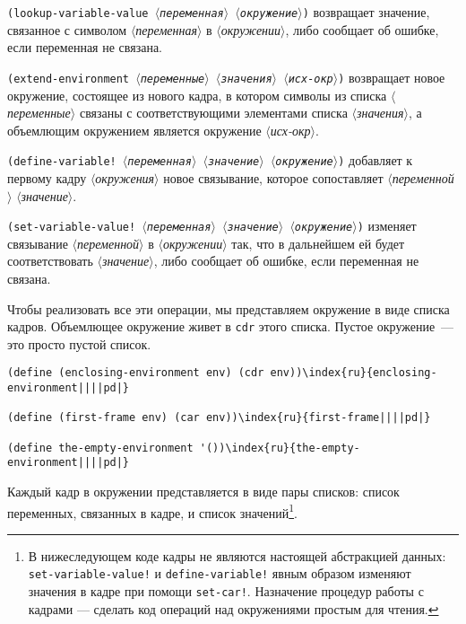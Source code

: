 \begin{plainlist}
\sloppy
\item
{\tt (lookup-variable-value \textit{$\langle$переменная$\rangle$} \textit{$\langle$окружение$\rangle$})}  
возвращает зна\-че\-ние, связанное с 
символом \textit{$\langle$переменная$\rangle$}
в \textit{$\langle$окружении$\rangle$}, либо сообщает об ошибке, если переменная
не связана.

\item
{\tt (extend-environment \textit{$\langle$переменные$\rangle$} \textit{$\langle$значения$\rangle$} \textit{$\langle$исх-окр$\rangle$})} 
возвращает новое окружение, состоящее 
из нового кадра, в котором 
символы из списка \textit{$\langle$переменные$\rangle$} связаны с
соответствующими элементами списка \textit{$\langle$значения$\rangle$}, а
объемлющим окружением является окружение \textit{$\langle$исх-окр$\rangle$}.

\item
{\tt (define-variable! \textit{$\langle$переменная$\rangle$} \textit{$\langle$значение$\rangle$} \textit{$\langle$окружение$\rangle$})}%
 добавляет к первому кадру \textit{$\langle$окружения$\rangle$} новое
связывание, которое сопоставляет \textit{$\langle$пе\-ре\-мен\-ной$\rangle$}
\textit{$\langle$значение$\rangle$}.

\item
{\tt (set-variable-value! \textit{$\langle$переменная$\rangle$} \textit{$\langle$значение$\rangle$} \textit{$\langle$окружение$\rangle$})}  
изменяет связывание \textit{$\langle$переменной$\rangle$} в
\textit{$\langle$окружении$\rangle$} так, что в дальнейшем ей будет соответствовать
\textit{$\langle$значение$\rangle$}, либо сообщает об ошибке, если переменная не
связана.
\end{plainlist}

Чтобы реализовать все эти операции, мы представляем
окружение в виде списка кадров.  Объемлющее окружение живет в
{\tt cdr} этого списка. Пустое окружение~--- это просто пустой
список.

\begin{Verbatim}[fontsize=\small]
(define (enclosing-environment env) (cdr env))\index{ru}{enclosing-environment||||pd|}

(define (first-frame env) (car env))\index{ru}{first-frame||||pd|}

(define the-empty-environment '())\index{ru}{the-empty-environment||||pd|}
\end{Verbatim}
Каждый кадр в окружении представляется в виде пары списков: список
переменных, связанных в кадре, и список значений\footnote{В нижеследующем 
коде кадры не являются настоящей
абстракцией данных: {\tt set-variable-value!} и
{\tt define-variable!} явным образом изменяют значения в кадре
при помощи {\tt set-car!}.  Назначение процедур работы с кадрами ---
сделать код операций над окружениями простым для чтения.}.

